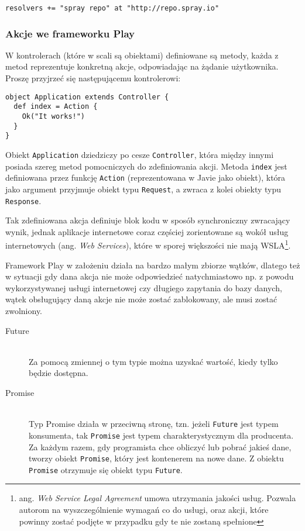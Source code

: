 \begin{lstlisting}
resolvers += "spray repo" at "http://repo.spray.io"
\end{lstlisting}

\subsubsection{Akcje we frameworku Play}

W kontrolerach (które w scali są obiektami) definiowane są metody, każda z metod reprezentuje konkretną akcje, odpowiadając na żądanie użytkownika. Proszę przyjrzeć się następującemu kontrolerowi:

\begin{lstlisting}
object Application extends Controller {
  def index = Action {
    Ok("It works!")
  }
}
\end{lstlisting}

Obiekt \lstinline{Application} dziedziczy po cesze \lstinline{Controller}, która między innymi posiada szereg metod pomocniczych do zdefiniowania akcji. Metoda \lstinline{index} jest definiowana przez funkcję \lstinline{Action} (reprezentowana w Javie jako obiekt), która jako argument przyjmuje obiekt typu \lstinline{Request}, a zwraca z kolei obiekty typu \lstinline{Response}. 

\par

Tak zdefiniowana akcja definiuje blok kodu w sposób synchroniczny zwracający wynik, jednak aplikacje internetowe coraz częściej zorientowane są wokół usług internetowych (ang. \emph{Web Services}), które w sporej większości nie mają WSLA\footnote{ang. \emph{Web Service Legal Agreement} umowa utrzymania jakości usług. Pozwala autorom na wyszczególnienie wymagań co do usługi, oraz akcji, które powinny zostać podjęte w przypadku gdy te nie zostaną spełnione}.

\par

Framework Play w założeniu działa na bardzo małym zbiorze wątków, dlatego też w sytuacji gdy dana akcja nie może odpowiedzieć natychmiastowo np. z powodu wykorzystywanej usługi internetowej czy długiego zapytania do bazy danych, wątek obsługujący daną akcje nie może zostać zablokowany, ale musi zostać zwolniony.

\begin{description}	
	\item[Future] \hfill \\
		Za pomocą zmiennej o tym typie można uzyskać wartość, kiedy tylko będzie dostępna.
	\item[Promise] \hfill \\
		Typ Promise działa w przeciwną stronę, tzn. jeżeli \lstinline{Future} jest typem konsumenta, tak \lstinline{Promise} jest typem charakterystycznym dla producenta. Za każdym razem, gdy programista chce obliczyć lub pobrać jakieś dane, tworzy obiekt \lstinline{Promise}, który jest kontenerem na nowe dane. Z obiektu \lstinline{Promise} otrzymuje się obiekt typu \lstinline{Future}.
\end{description}

